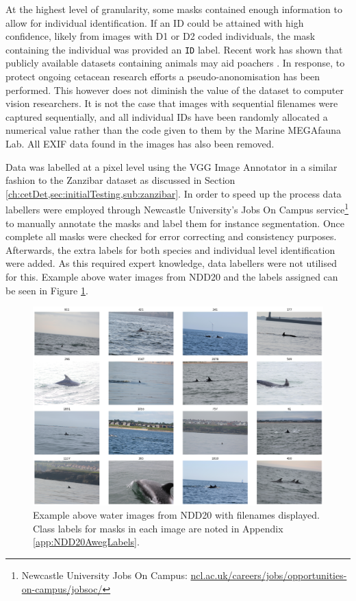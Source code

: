 At the highest level of granularity, some masks contained enough information to allow for individual identification. If an ID could be attained with high confidence, likely from images with D1 or D2 coded individuals, the mask containing the individual was provided an \texttt{ID} label. Recent work has shown that publicly available datasets containing animals may aid poachers \cite{beery_can_2021}. In response, to protect ongoing cetacean research efforts a pseudo-anonomisation has been performed. This however does not diminish the value of the dataset to computer vision researchers. It is not the case that images with sequential filenames were captured sequentially, and all individual IDs have been randomly allocated a numerical value rather than the code given to them by the Marine MEGAfauna Lab. All EXIF data found in the images has also been removed.

Data was labelled at a pixel level using the VGG Image Annotator \cite{dutta_via_2019} in a similar fashion to the Zanzibar dataset as discussed in Section \ref{ch:cetDet,sec:initialTesting,sub:zanzibar}. In order to speed up the process data labellers were employed through Newcastle University's Jobs On Campus service\footnote{Newcastle University Jobs On Campus: \href{https://www.ncl.ac.uk/careers/jobs/opportunities-on-campus/jobsoc/\#jobsocoverview}{ncl.ac.uk/careers/jobs/opportunities-on-campus/jobsoc/}} to manually annotate the masks and label them for instance segmentation. Once complete all masks were checked for error correcting and consistency purposes. Afterwards, the extra labels for both species and individual level identification were added. As this required expert knowledge, data labellers were not utilised for this. Example above water images from NDD20 and the labels assigned can be seen in Figure \ref{fig:above-water-example}.

\begin{figure}
	\begin{center}
		\includegraphics[scale=0.3]{Chapter4/figs/aweg-tiled.png}
	\end{center}
	\caption[Example above water images from NDD20 with filenames displayed.]{Example above water images from NDD20 with filenames displayed. Class labels for masks in each image are noted in Appendix \ref{app:NDD20AwegLabels}.}
	\label{fig:above-water-example}
\end{figure}

